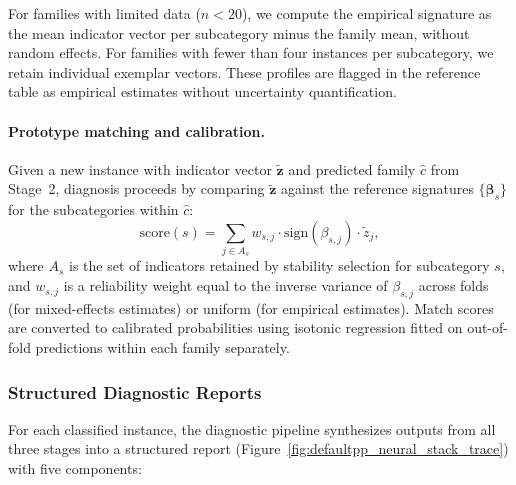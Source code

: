 For families with limited data ($n < 20$), we compute the empirical signature as the mean indicator vector per subcategory minus the family mean, without random effects. For families with fewer than four instances per subcategory, we retain individual exemplar vectors. These profiles are flagged in the reference table as empirical estimates without uncertainty quantification.

\paragraph{Prototype matching and calibration.}
\label{sec:defaultpp_matching}

Given a new instance with indicator vector $\tilde{\mathbf{z}}$ and predicted family $\hat{c}$ from Stage~2, diagnosis proceeds by comparing $\tilde{\mathbf{z}}$ against the reference signatures $\{\boldsymbol{\beta}_s\}$ for the subcategories within $\hat{c}$:
\begin{equation}
\text{score}(s) = \sum_{j \in A_s} w_{s,j} \cdot \text{sign}(\beta_{s,j}) \cdot \tilde{z}_j,
\label{eq:matching}
\end{equation}
where $A_s$ is the set of indicators retained by stability selection for subcategory $s$, and $w_{s,j}$ is a reliability weight equal to the inverse variance of $\beta_{s,j}$ across folds (for mixed-effects estimates) or uniform (for empirical estimates). Match scores are converted to calibrated probabilities using isotonic regression fitted on out-of-fold predictions within each family separately.

\subsubsection{Structured Diagnostic Reports}
\label{sec:defaultpp_reports}

For each classified instance, the diagnostic pipeline synthesizes outputs from all three stages into a structured report (Figure~\ref{fig:defaultpp_neural_stack_trace}) with five components:

